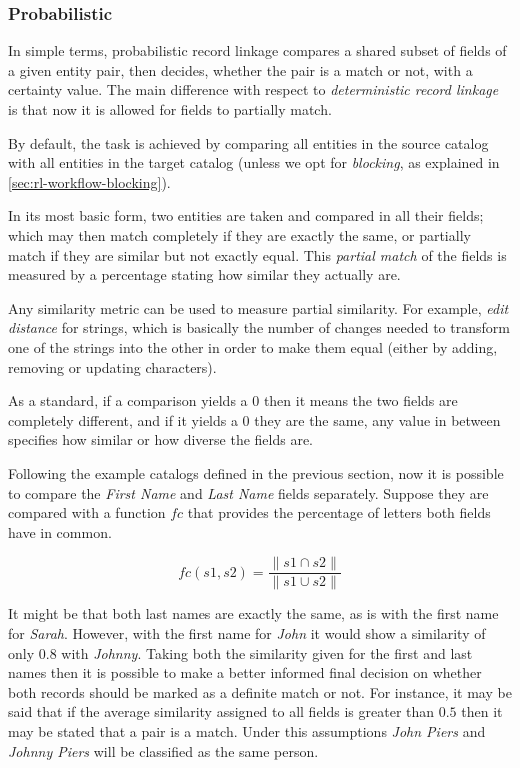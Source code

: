 \documentclass[epsfig,a4paper,11pt,titlepage,twoside,openany]{book}
\begin{document}
\subsubsection{Probabilistic}
\label{sec:rl-approach-probabilistic}

In simple terms, probabilistic record linkage \cite{Sayers2015} compares a shared subset of fields of a given entity pair, then decides, whether the pair is a match or not, with a certainty value. The main difference with respect to \textit{deterministic record linkage} is that now it is allowed for fields to partially match.

By default, the task is achieved by comparing all entities in the source catalog with all entities in the target catalog (unless we opt for \textit{blocking}, as explained in \autoref{sec:rl-workflow-blocking}). 

In its most basic form, two entities are taken and compared in all their fields; which may then match completely if they are exactly the same, or partially match if they are similar but not exactly equal. This \textit{partial match} of the fields is measured by a percentage stating how similar they actually are. 

Any similarity metric can be used to measure partial similarity. For example, \textit{edit distance} for strings, which is basically the number of changes needed to transform one of the strings into the other in order to make them equal (either by adding, removing or updating characters). 

As a standard, if a comparison yields a 0 then it means the two fields are completely different, and if it yields a 0 they are the same, any value in between specifies how similar or how diverse the fields are.

Following the example catalogs defined in the previous section, now it is possible to compare the \textit{First Name} and \textit{Last Name} fields separately.
Suppose they are compared with a function $fc$ that provides the percentage of
letters both fields have in common.


$$
fc(s1, s2) = \frac{\| s1 \cap s2 \|}{\| s1 \cup s2 \|}
$$


It might be that both last names are exactly the same, as is with the first name for \textit{Sarah}. However, with the first name for \textit{John} it would show a similarity of only $0.8$ with \textit{Johnny}. Taking both the similarity given for the first and last names then it is possible to make a better informed final decision on whether both records should be marked as a definite match or not.  For instance, it may be said that if the average similarity assigned to all fields is greater than $0.5$ then it may be stated that a pair is a match. Under this assumptions \textit{John Piers} and \textit{Johnny Piers} will be classified as the same person.
\end{document}
